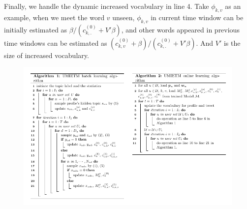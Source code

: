 \documentclass[runningheads,a4paper]{llncs}
\begin{document}
Finally, we handle the dynamic increased vocabulary in line 4.
Take \(\phi_{k,v}\) as an example, when we meet the word \(v\) unseen, \(\phi_{k,v}\) in current time window can be initially estimated as \(\beta / (c^{(0)}_{k,.}+V'\beta)\), and other words appeared in previous time windows can be estimated as \((c^{(0)}_{k,v}+\beta) / (c^{(0)}_{k,.}+V'\beta)\).
And \(V'\) is the size of increased vocabulary.

\begin{figure}
        \centering
        \includegraphics[width=1.0\textwidth]{img/algorithm.pdf}
\end{figure}
\end{document}
